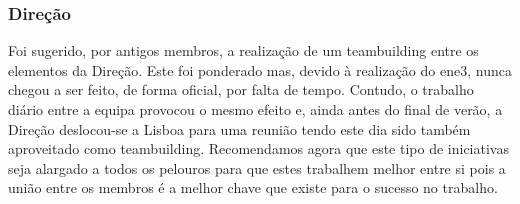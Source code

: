 
\subsubsection{Direção}

Foi sugerido, por antigos membros, a realização de um teambuilding entre os elementos da Direção. Este foi ponderado mas, devido à realização do \acrshort{ene3}, nunca chegou a ser feito, de forma oficial, por falta de tempo. Contudo, o trabalho diário entre a equipa provocou o mesmo efeito e, ainda antes do final de verão, a Direção deslocou-se a Lisboa para uma reunião tendo este dia sido também aproveitado como teambuilding. Recomendamos agora que este tipo de iniciativas seja alargado a todos os pelouros para que estes trabalhem melhor entre si pois a união entre os membros é a melhor chave que existe para o sucesso no trabalho.